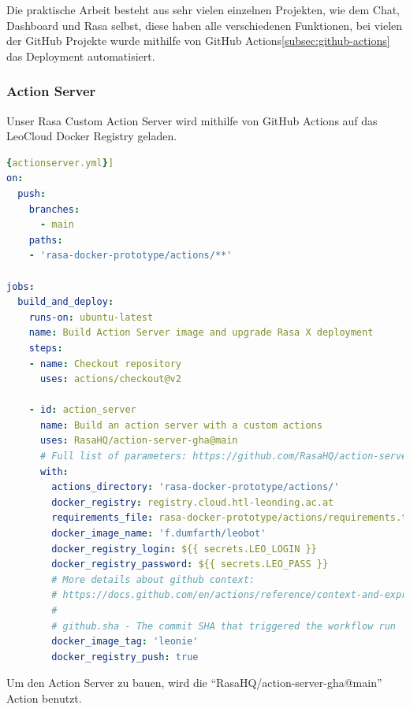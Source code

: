 Die praktische Arbeit besteht aus sehr vielen einzelnen Projekten, wie dem Chat, Dashboard und Rasa selbst, diese haben alle verschiedenen Funktionen, bei vielen der GitHub Projekte wurde mithilfe von GitHub Actions\ref{subsec:github-actions} das Deployment automatisiert.

\subsubsection{Action Server}
Unser Rasa Custom Action Server wird mithilfe von GitHub Actions auf das LeoCloud Docker Registry geladen.

\begin{lstlisting}[language=yaml,label={lst:actionserveryml},caption={action\_server.yml}]{actionserver.yml}]
on:
  push:
    branches:
      - main
    paths:
    - 'rasa-docker-prototype/actions/**'

jobs:
  build_and_deploy:
    runs-on: ubuntu-latest
    name: Build Action Server image and upgrade Rasa X deployment
    steps:
    - name: Checkout repository
      uses: actions/checkout@v2

    - id: action_server
      name: Build an action server with a custom actions
      uses: RasaHQ/action-server-gha@main
      # Full list of parameters: https://github.com/RasaHQ/action-server-gha/tree/master#input-arguments
      with:
        actions_directory: 'rasa-docker-prototype/actions/'
        docker_registry: registry.cloud.htl-leonding.ac.at
        requirements_file: rasa-docker-prototype/actions/requirements.txt
        docker_image_name: 'f.dumfarth/leobot'
        docker_registry_login: ${{ secrets.LEO_LOGIN }}
        docker_registry_password: ${{ secrets.LEO_PASS }}
        # More details about github context:
        # https://docs.github.com/en/actions/reference/context-and-expression-syntax-for-github-actions#github-context
        #
        # github.sha - The commit SHA that triggered the workflow run
        docker_image_tag: 'leonie'
        docker_registry_push: true
\end{lstlisting}

Um den Action Server zu bauen, wird die ``RasaHQ/action-server-gha@main'' Action\cite{actionServerAction} benutzt.


